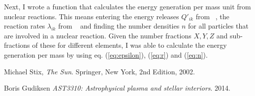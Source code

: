 \documentclass[a4paper, 11pt, english]{article}
\newcommand{\refeq}[1]{(\textcolor{red}{\ref{eq:#1}})} %
\begin{document}
Next, I wrote a function that calculates the energy generation per mass unit from nuclear
reactions. This means entering the energy releases $Q'_{ik}$ from ~\cite[p.~39,
Table~2.1]{stix}, the reaction rates $\lambda_{ik}$ from ~\cite[p.~46,
Table~2.3]{stix} and finding the number densities $n$ for all particles that are involved
in a nuclear reaction. Given the number fractions $X,Y,Z$ and sub-fractions of these
for different elements, I was able to calculate the energy generation per mass by using
eq. \refeq{epsilon}, \refeq{r} and \refeq{n}.




\begin{thebibliography}{9}
		Michael Stix,
		\emph{The Sun}.
		Springer, New York,
		2nd Edition,
		2002.

		Boris Gudiksen
		\emph{AST3310: Astrophysical plasma and stellar interiors}.
		2014.

\end{thebibliography}
\end{document}
